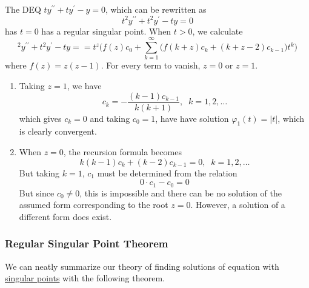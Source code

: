 \documentclass{article}
\newcounter{theorem}[section]
\newcounter{example}[section]
\begin{document}
      \begin{example}
        \label{ex:a-regular-singular-point}
      The DEQ $t y^{\prime\prime} + ty^\prime - y = 0$, which can be rewritten as
      \begin{equation}
        t^2 y^{\prime\prime} + t^2 y^\prime - ty = 0
      \end{equation}
      has $t = 0$ has a regular singular point. When $t>0$, we calculate
      \begin{equation}
        ^2 y^{\prime\prime} + t^2 y^\prime - ty =  = t^z \bigg( f(z) c_0 + \sum_{k=1}^\infty \big( f(k+z) c_k + (k+z-2) c_{k-1}\big) t^k \bigg)
      \end{equation}
      where $f(z) = z (z-1)$. For every term to vanish, $z = 0$ or $z = 1$. 
      \begin{enumerate}
          \item Taking $z = 1$, we have 
          \begin{equation}
            c_k = -\frac{(k-1) c_{k-1}}{k (k+1)}, \;\; k = 1, 2, \ldots
          \end{equation}
          which gives $c_k = 0$ and taking $c_0 = 1$, have have solution $\varphi_1 (t) = |t|$, which is clearly convergent. 
          \item When $z=0$, the recursion formula becomes
          \begin{equation}
            k(k-1) c_k + (k-2) c_{k-1} = 0, \;\; k = 1, 2, \ldots
          \end{equation}
          But taking $k=1$, $c_1$ must be determined from the relation 
          \begin{equation}
            0 \cdot c_1 - c_0 = 0
          \end{equation}
          But since $c_0 \neq 0$, this is impossible and there can be no solution of the assumed form corresponding to the root $z=0$. However, a solution of a different form does exist. 
      \end{enumerate}
      \end{example}

    \subsubsection{Regular Singular Point Theorem}

      We can neatly summarize our theory of finding solutions of equation with \hyperref[def:singular-point]{singular points} with the following theorem. 
\end{document}
